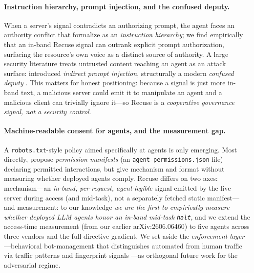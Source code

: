 \documentclass{article}
\begin{document}
\paragraph{Instruction hierarchy, prompt injection, and the confused deputy.}
When a server's signal contradicts an authorizing prompt, the agent faces an
authority conflict that \citet{wallace2024instruction} formalize as an
\emph{instruction hierarchy}; we find empirically that an in-band Recuse signal
can outrank explicit prompt authorization, surfacing the resource's own voice as a
distinct source of authority. A large security literature treats untrusted content
reaching an agent as an attack surface: \citet{greshake2023injection} introduced
\emph{indirect prompt injection}, structurally a modern \emph{confused deputy}
\citep{hardy1988confused}. This matters for honest positioning: because a signal is
just more in-band text, a malicious server could emit it to manipulate an agent and
a malicious client can trivially ignore it---so Recuse is a \emph{cooperative
governance signal, not a security control}.

\paragraph{Machine-readable consent for agents, and the measurement gap.}
A \texttt{robots.txt}-style policy aimed specifically at agents is only emerging.
Most directly, \citet{marro2026permission} propose \emph{permission manifests} (an
\texttt{agent-permissions.json} file) declaring permitted interactions, but give
mechanism and format without measuring whether deployed agents comply. Recuse
differs on two axes: mechanism---an \emph{in-band, per-request, agent-legible}
signal emitted by the live server during access (and mid-task), not a separately
fetched static manifest---and measurement: to our knowledge \emph{we are the first
to empirically measure whether deployed LLM agents honor an in-band mid-task
\texttt{halt}}, and we extend the access-time measurement (from our earlier
arXiv:2606.06460) to five agents across three vendors and the full directive
gradient. We set aside the \emph{enforcement layer}---behavioral bot-management
that distinguishes automated from human traffic via traffic patterns and
fingerprint signals \citep{iliou2021bots}---as orthogonal future work for the
adversarial regime.
\end{document}
